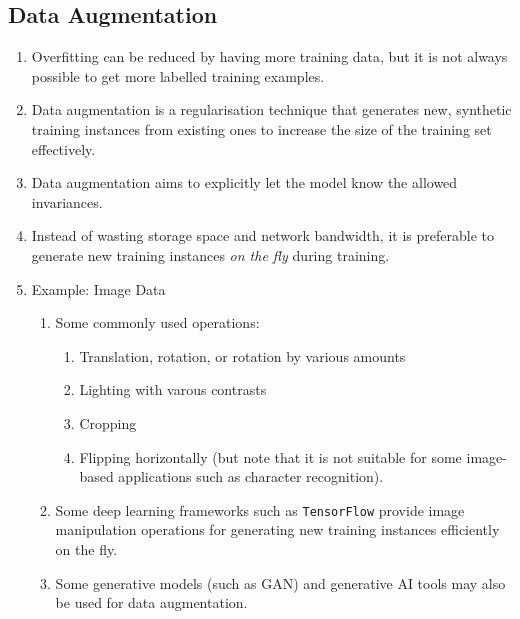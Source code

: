 \documentclass[11pt]{article}
\begin{document}
\subsection{Data Augmentation}
\begin{enumerate}
    \item Overfitting can be reduced by having more training data, but it is not always possible to get more labelled training examples. 
    \item Data augmentation is a regularisation technique that generates new, synthetic training instances from existing ones to increase the size of the training set effectively.
    \item Data augmentation aims to explicitly let the model know the allowed invariances.
    \item Instead of wasting storage space and network bandwidth, it is preferable to generate new training instances \emph{on the fly} during training.
    \item Example: Image Data
    \begin{enumerate}
        \item Some commonly used operations:
    \begin{enumerate}
        \item Translation, rotation, or rotation by various amounts
        \item Lighting with varous contrasts
        \item Cropping 
        \item Flipping horizontally (but note that it is not suitable for some image-based applications such as character recognition).
    \end{enumerate}
    \item Some deep learning frameworks such as \texttt{TensorFlow} provide image manipulation operations for generating new training instances efficiently on the fly.
    \item Some generative models (such as GAN) and generative AI tools may also be used for data augmentation.
    \end{enumerate}
\end{enumerate}
\end{document}
